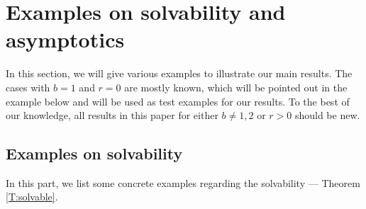 \documentclass[a4paper,11pt]{article}
\numberwithin{equation}{section}
\numberwithin{equation}{section}
\theoremstyle{plain}
\theoremstyle{definition}
\begin{document}
\section{Examples on solvability and asymptotics} \label{S:SolvEx}

In this section, we will give various examples to illustrate our main results. The cases with $b=1$
and $r=0$ are mostly known, which will be pointed out in the example below and will be used as test
examples for our results. To the best of our knowledge, all results in this paper for either $b\ne
1,2$ or $r>0$ should be new.

\subsection{Examples on solvability}

In this part, we list some concrete examples regarding the solvability --- Theorem \ref{T:solvable}.
\end{document}
